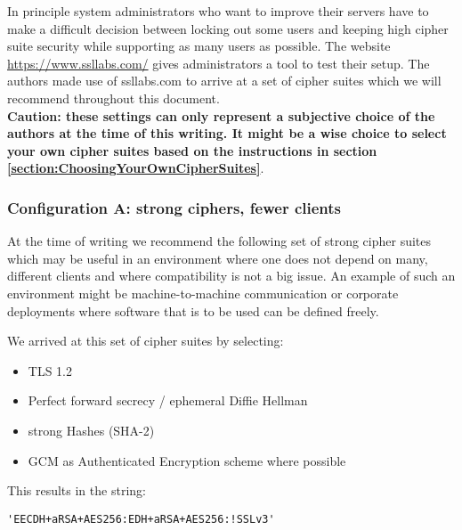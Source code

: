 
In principle system administrators who want to improve their servers have to
make a difficult decision between locking out some users and keeping high
cipher suite security while supporting as many users as possible.
The website \url{https://www.ssllabs.com/} gives administrators a
tool to test their setup. The authors made use of ssllabs.com
to arrive at a set of cipher suites which we will recommend throughout this
document.\\

\textbf{Caution: these settings can only represent a subjective
choice of the authors at the time of this writing. It might be a wise choice to
select your own cipher suites based on the instructions in section
\ref{section:ChoosingYourOwnCipherSuites}}.


\subsubsection{Configuration A: strong ciphers, fewer clients}

At the time of writing we recommend the following set of strong cipher
suites which may be useful in an environment where one does not depend on many,
different clients and where compatibility is not a big issue.  An example
of such an environment might be machine-to-machine communication or corporate
deployments where software that is to be used can be defined freely.


We arrived at this set of cipher suites by selecting:

\begin{itemize}
\item TLS 1.2
\item Perfect forward secrecy / ephemeral Diffie Hellman
\item strong Hashes (SHA-2)
\item GCM as Authenticated Encryption scheme where possible
\end{itemize}

This results in the string:

\begin{lstlisting}[breaklines]
'EECDH+aRSA+AES256:EDH+aRSA+AES256:!SSLv3'
\end{lstlisting}

%



